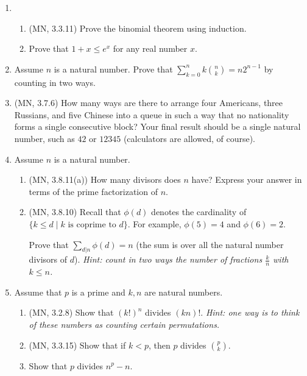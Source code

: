 \documentclass{amsart}
\theoremstyle{definition}
\begin{document}
\begin{enumerate}
\item
  \begin{enumerate}
  \item (MN, 3.3.11) Prove the binomial theorem using induction.
  \item Prove that $1 + x \le e^x$ for any real number $x$.
  \end{enumerate}

\item Assume $n$ is a natural number. Prove  that $\sum_{k = 0}^n k {n \choose k} = n 2^{n - 1}$ by counting in two ways.
\item (MN, 3.7.6) How many ways are there to arrange four Americans, three Russians, and five Chinese into a queue in such a way that no nationality forms a single consecutive block? Your final result should be a single natural number, such as $42$ or $12345$ (calculators are allowed, of course).
  
\item Assume $n$ is a natural number.

  \begin{enumerate}
  \item (MN, 3.8.11(a)) How many divisors does $n$ have? Express your answer in terms of the prime factorization of $n$.
  \item (MN, 3.8.10) Recall that $\phi (d)$ denotes the cardinality of $\{k \le d \mid k \text{ is coprime to } d\}$. For example, $\phi (5) = 4$ and $\phi (6) = 2$.

    Prove that $\sum_{d | n} \phi (d) = n$ (the sum is over all the natural number divisors of $d$).  \emph{Hint: count in two ways the number of fractions $\frac{k}{n}$ with $k \le n$.}
  \end{enumerate}

\item Assume that $p$ is a prime and $k, n$ are natural numbers.
  \begin{enumerate}
  \item (MN, 3.2.8) Show that $(k!)^n$ divides $(kn)!$. \emph{Hint: one way is to think of these numbers as counting certain permutations.}
  \item (MN, 3.3.15) Show that if $k < p$, then $p$ divides $p \choose k$.
  \item Show that $p$ divides $n^p - n$.
  \end{enumerate}  
\end{enumerate}
\end{document}
